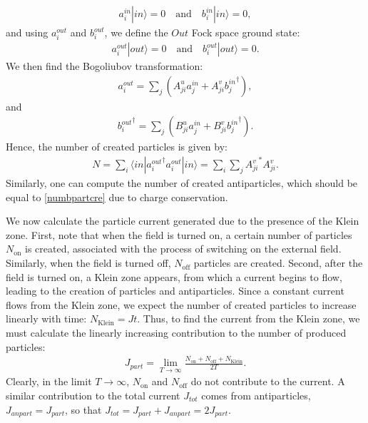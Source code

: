 \documentclass[12pt]{article}
\numberwithin{equation}{section}
\begin{document}
\begin{align}
    a^{in}_i |in \rangle = 0 \quad \text{and} \quad b^{in}_i |in\rangle = 0,
\end{align}
and using $a^{out}_i$ and $b^{out}_i$, we define the $Out$ Fock space ground state:
\begin{align}
    a^{out}_i |out \rangle = 0 \quad \text{and} \quad b^{out}_i |out\rangle = 0.
\end{align}
We then find the Bogoliubov transformation:
\begin{align}
    a^{out}_i = \sum_j \left( A^u_{ji} a^{in}_j + A^v_{ji} {b_j^{in}}^\dagger \right),
\end{align}
and
\begin{align}
    {b^{out}_i}^\dagger = \sum_j \left( B^u_{ji} a^{in}_j + B^v_{ji} {b_j^{in}}^\dagger \right).
\end{align}
Hence, the number of created particles is given by:
\begin{gather}
\label{numbpartcre}
   N = \sum_i \langle in| {a^{out}_i}^\dagger a^{out}_i |in\rangle 
   = \sum_i \sum_j {A^v_{ji}}^* A^v_{ji}. 
\end{gather}
Similarly, one can compute the number of created antiparticles, which should be equal to \eqref{numbpartcre} due to charge conservation.

We now calculate the particle current generated due to the presence of the Klein zone. First, note that when the field is turned on, a certain number of particles $N_{\text{on}}$ is created, associated with the process of switching on the external field. Similarly, when the field is turned off, $N_{\text{off}}$ particles are created. Second, after the field is turned on, a Klein zone appears, from which a current begins to flow, leading to the creation of particles and antiparticles. Since a constant current flows from the Klein zone, we expect the number of created particles to increase linearly with time: $N_{\text{Klein}} = J t$. Thus, to find the current from the Klein zone, we must calculate the linearly increasing contribution to the number of produced particles:
\begin{align}
J_{part} = \lim_{T\to \infty} \frac{N_{\text{on}} + N_{\text{off}} + N_{\text{Klein}}}{2T}.
\end{align}
Clearly, in the limit $T \to \infty$, $N_{\text{on}}$ and $N_{\text{off}}$ do not contribute to the current. A similar contribution to the total current $J_{tot}$ comes from antiparticles, $J_{anpart} = J_{part}$, so that $J_{tot} = J_{part} + J_{anpart} = 2 J_{part}$.
\end{document}
